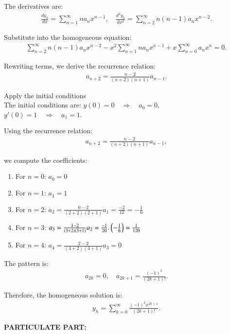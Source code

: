 \documentclass[journal]{IEEEtran}
\begin{document}
The derivatives are:
\begin{align}
\frac{dy_h}{dx} = \sum_{n=1}^\infty n a_n x^{n-1}, \quad 
\frac{d^2y_h}{dx^2} = \sum_{n=2}^\infty n(n-1)a_n x^{n-2}.
\end{align}

Substitute into the homogeneous equation:
\begin{align}
\sum_{n=2}^\infty n(n-1)a_n x^{n-2} - x^2 \sum_{n=1}^\infty n a_n x^{n-1} + x \sum_{n=0}^\infty a_n x^n = 0.
\end{align}

Rewriting terms, we derive the recurrence relation:
\begin{align}
a_{n+2} = \frac{n-2}{(n+2)(n+1)}a_{n-1}.
\end{align}

Apply the initial conditions\\

The initial conditions are:
$y(0) = 0 \quad \Rightarrow \quad a_0 = 0,$\\
$y'(0) = 1 \quad \Rightarrow \quad a_1 = 1.$

Using the recurrence relation:
\begin{align}
a_{n+2} = \frac{n-2}{(n+2)(n+1)}a_{n-1},
\end{align}

we compute the coefficients:

\begin{enumerate}
    \item For $n = 0$: $a_0 = 0$
    \item For $n = 1$: $a_1 = 1$
    \item For $n = 2$: $a_2 = \frac{0 - 2}{(2+2)(2+1)}a_1 = \frac{-2}{12} = -\frac{1}{6}$
    \item For $n = 3$: $a_3 = \frac{1 - 2}{(3+2)(3+1)}a_2 = \frac{-1}{20}.\left(-\frac{1}{6}\right) = \frac{1}{120}$
    \item For $n = 4$: $a_4 = \frac{2 - 2}{(4+2)(4+1)}a_3 = 0$
\end{enumerate}

The pattern is:
\begin{align}
a_{2k} = 0, \quad a_{2k+1} = \frac{(-1)^k}{(2k+1)!}.
\end{align}

Therefore, the homogeneous solution is:
\begin{align}
y_h = \sum_{k=0}^\infty \frac{(-1)^k x^{2k+1}}{(2k+1)!}.
\end{align}

\textbf{PARTICULATE  PART:}\\
\end{document}
